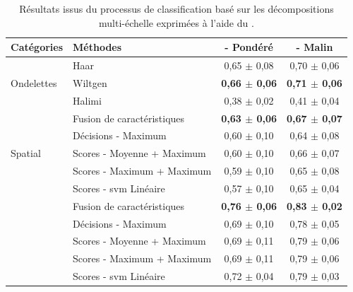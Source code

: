 \begin{table}[H]
    \centering
    \begin{tabular}{llcc}
        \toprule
        Catégories                  & Méthodes                      & \Fscore{} - Pondéré     & \Fscore{} - Malin     \\ \midrule
        \multirow{3}{*}{Ondelettes} & Haar                          & 0,65 $\pm$ 0,08         & 0,70 $\pm$ 0,06         \\
                                    & Wiltgen~\cite{Wiltgen2008}    & \textbf{0,66 $\pm$ 0,06}& \textbf{0,71 $\pm$ 0,06}\\
                                    & Halimi~\cite{Halimi2017a}     & 0,38 $\pm$ 0,02         & 0,41 $\pm$ 0,04         \\ \midrule
        \multirow{5}{*}{Spatial}    & Fusion de caractéristiques    & \textbf{0,63 $\pm$ 0,06}& \textbf{0,67 $\pm$ 0,07}\\
                                    & Décisions - Maximum           & 0,60 $\pm$ 0,10         & 0,64 $\pm$ 0,08         \\
                                    & Scores - Moyenne + Maximum    & 0,60 $\pm$ 0,10         & 0,66 $\pm$ 0,07         \\
                                    & Scores - Maximum + Maximum    & 0,59 $\pm$ 0,10         & 0,65 $\pm$ 0,08         \\
                                    & Scores - \gls{svm} Linéaire   & 0,57 $\pm$ 0,10         & 0,65 $\pm$ 0,04         \\ \midrule \rowcolor[HTML]{E7E6E6}
        \multirow{5}{*}{Transfert}  & Fusion de caractéristiques    & \textbf{0,76 $\pm$ 0,06}& \textbf{0,83 $\pm$ 0,02}\\ 
                                    & Décisions - Maximum           & 0,69 $\pm$ 0,10         & 0,78 $\pm$ 0,05         \\
                                    & Scores - Moyenne + Maximum    & 0,69 $\pm$ 0,11         & 0,79 $\pm$ 0,06         \\
                                    & Scores - Maximum + Maximum    & 0,69 $\pm$ 0,11         & 0,79 $\pm$ 0,06         \\
                                    & Scores - \gls{svm} Linéaire   & 0,72 $\pm$ 0,04         & 0,79 $\pm$ 0,03         \\
        \bottomrule
    \end{tabular}
    \caption{Résultats issus du processus de classification basé sur les décompositions multi-échelle exprimées à l'aide du \fscore.}
    \vspace{-1em}
    \label{tab:results_image_improvement_multiresolution}
\end{table}

